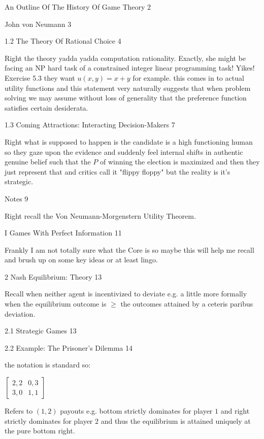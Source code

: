 An Outline Of The History Of Game Theory 2



John von Neumann 3



1.2 The Theory Of Rational Choice 4

Right the theory yadda yadda computation rationality. Exactly, she might be facing an NP hard task of a constrained integer linear programming task! Yikes! Exercise 5.3 they want $u(x,y)=x+y$ for example. this comes in to actual utility functions and this statement very naturally suggests that when problem solving we may assume without loss of generality that the preference function satisfies certain desiderata.

1.3 Coming Attractions: Interacting Decision-Makers 7

Right what is supposed to happen is the candidate is a high functioning human so they gaze upon the evidence and suddenly feel internal shifts in authentic genuine belief such that the $P$ of winning the election is maximized and then they just represent that and critics call it "flippy floppy" but the reality is it's strategic.

Notes 9

Right recall the Von Neumann-Morgenstern Utility Theorem.

I Games With Perfect Information 11

Frankly I am not totally sure what the Core is so maybe this will help me recall and brush up on some key ideas or at least lingo.

2 Nash Equilibrium: Theory 13

Recall when neither agent is incentivized to deviate e.g. a little more formally when the equilibrium outcome is $\ge$ the outcomes attained by a ceteris paribus deviation.

2.1 Strategic Games 13



2.2 Example: The Prisoner's Dilemma 14

the notation is standard so:

$
\begin{bmatrix}
2,2 & 0,3 \\
3,0 & 1,1
\end{bmatrix}
$

Refers to $(1,2)$ payouts e.g. bottom strictly dominates for player $1$ and right strictly dominates for player $2$ and thus the equilibrium is attained uniquely at the pure bottom right.


